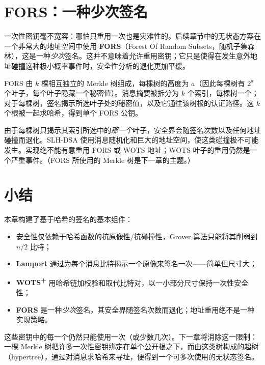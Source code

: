 \section{FORS：一种少次签名}
一次性密钥毫不宽容：哪怕只重用一次也是灾难性的。后续章节中的无状态方案在一个非常大的地址空间中使用 \textbf{FORS}（Forest Of Random Subsets，随机子集森林），这是一种\emph{少次}签名。这并不意味着允许重用密钥；它只是使得在发生意外地址碰撞这种极小概率事件时，安全性分析的退化更加平缓。

\begin{definition}[FORS]
FORS 由 $k$ 棵相互独立的 Merkle 树组成，每棵树的高度为 $a$（因此每棵树有 $2^a$ 个叶子，每个叶子隐藏一个秘密值）。消息摘要被拆分为 $k$ 个索引，每棵树一个；对于每棵树，签名揭示所选叶子处的秘密值，以及它通往该树根的认证路径。这 $k$ 个根被一起求哈希，得到单个 FORS 公钥。
\end{definition}

由于每棵树只揭示其索引所选中的\emph{那一个}叶子，安全界会随签名次数以及任何地址碰撞而退化。SLH-DSA 使用消息随机化和巨大的地址空间，使这类碰撞极不可能发生。实现绝不能有意重用 FORS 或 WOTS 地址；WOTS 叶子的重用仍然是一个严重事件。（FORS 所使用的 Merkle 树是下一章的主题。）

\section{小结}
本章构建了基于哈希的签名的基本组件：

\begin{itemize}
  \item 安全性仅依赖于哈希函数的抗原像性/抗碰撞性，Grover 算法只能将其削弱到 $n/2$ 比特；
  \item \textbf{Lamport} 通过为每个消息比特揭示一个原像来签名一次——简单但尺寸大；
  \item \textbf{WOTS\textsuperscript{+}} 用哈希链加校验和取代比特对，以一小部分尺寸保持一次性安全性；
  \item \textbf{FORS} 是一种\emph{少次}签名，其安全界随签名次数而退化；地址重用绝不是一种实现策略。
\end{itemize}

这些密钥中的每一个仍然只能使用一次（或少数几次）。下一章将消除这一限制：一棵 Merkle 树把许多一次性密钥绑定在单个公开根之下，而由这类树构成的超树（hypertree），通过对消息求哈希来寻址，便得到一个可多次使用的无状态签名。

\printbibliography[heading=chapterrefs]
